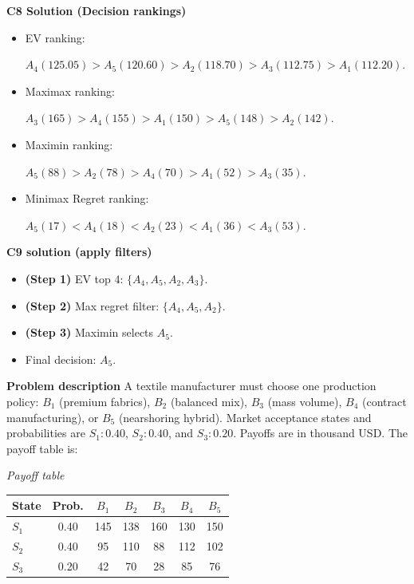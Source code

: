 \begin{ExamProblems}
		\textbf{C8 Solution (Decision rankings)}\par
		\begin{itemize}
			\item EV ranking: \par $A_4(125.05)>A_5(120.60)>A_2(118.70)>A_3(112.75)>A_1(112.20)$.
			\item Maximax ranking:\par $A_3(165)>A_4(155)>A_1(150)>A_5(148)>A_2(142)$.
			\item Maximin ranking: \par $A_5(88)>A_2(78)>A_4(70)>A_1(52)>A_3(35)$.
			\item Minimax Regret ranking:\par $A_5(17)<A_4(18)<A_2(23)<A_1(36)<A_3(53)$.
		\end{itemize}
		
		\textbf{C9 solution (apply filters)}\par
		\begin{itemize}
			\item \textbf{(Step 1)} EV top 4: $\{A_4,A_5,A_2,A_3\}$.
			\item \textbf{(Step 2)} Max regret filter: $\{A_4,A_5,A_2\}$.
			\item \textbf{(Step 3)} Maximin selects $A_5$.
			\item Final decision: $A_5$.
		\end{itemize}
		
		\newpage
		\item
		\textbf{Problem description}
		A textile manufacturer must choose one production policy: $B_1$ (premium fabrics), $B_2$ (balanced mix), $B_3$ (mass volume), $B_4$ (contract manufacturing), or $B_5$ (nearshoring hybrid).
		Market acceptance states and probabilities are $S_1:0.40$, $S_2:0.40$, and $S_3:0.20$. Payoffs are in thousand USD. The payoff table is:
		
		\begin{center}
			\textit{Payoff table} \\
			\begin{tabular}{l c c c c c c}
				\hline
				State& Prob. & $B_1$ & $B_2$ & $B_3$ & $B_4$ & $B_5$ \\
				\hline
				$S_1$ & 0.40 & 145 & 138 & 160 & 130 & 150 \\
				$S_2$ & 0.40 & 95 & 110 & 88 & 112 & 102 \\
				$S_3$ & 0.20 & 42 & 70 & 28 & 85 & 76 \\
				\hline
			\end{tabular}
		\end{center}
		

\end{ExamProblems}
